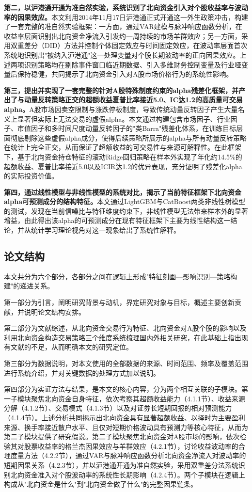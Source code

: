 \documentclass{article}
\begin{document}
\textbf{第二，以沪港通开通为准自然实验，系统识别了北向资金引入对个股收益率与波动率的因果效应。}本文利用2014年11月17日沪港通正式开通这一外生政策冲击，构建了一套完整的准自然实验框架：一方面，通过VAR建模与脉冲响应函数分析，在收益率层面识别出北向资金净流入引发约一周持续的市场羊群效应；另一方面，采用双重差分（DID）方法并控制个体固定效应与时间固定效应，在波动率层面首次系统地识别出"被纳入沪港通"这一处理变量对个股长期波动率的正向因果效应。上述两项识别策略均在剔除事件窗口临近期数据、引入多维财务控制变量及行业哑变量后保持稳健，共同揭示了北向资金引入对A股市场价格行为的系统性影响。

\textbf{第三，提出并实现了一套完整的针对A股特殊制度约束的alpha残差化框架，并产出了与动量反转策略正交的超额收益夏普比率接近5.0、IC达1.2的高质量可交易alpha。}A股市场因卖空限制与涨跌停板制度，导致传统动量反转因子产生大量名义上显著但实际上无法交易的虚假alpha。本文通过构建包含市场因子、行业因子、市值因子和多时间尺度动量反转因子的"类Barra"残差化体系，在训练目标层面彻底剔除这些虚假alpha成分，使得后续策略所展示的alpha与所有动量反转策略在统计上完全正交，从而保证了超额收益的可交易性与来源可解释性。在此框架下，基于北向资金持仓特征的滚动Ridge回归策略在样本外实现了年化约14.5\%的超额收益、夏普比率接近5.0以及ICIR达1.2的优异表现，充分证明了残差化alpha的实际投资价值。

\textbf{第四，通过线性模型与非线性模型的系统对比，揭示了当前特征框架下北向资金alpha可预测成分的结构特征。}本文通过LightGBM与CatBoost两类非线性树模型的测试，发现在当前信噪比与特征维度约束下，非线性模型无法带来样本外的显著增益，由此得出该alpha的可预测成分在现有特征框架下主要为线性结构这一结论，并从统计学习理论视角对这一现象给出了系统性解释。

\subsection{论文结构}

本文共分为六个部分，各部分之间在逻辑上形成"特征刻画—影响识别—策略构建"的递进关系。

第一部分为引言，阐明研究背景与动机，界定研究对象与目标，概述主要创新贡献，并说明论文结构安排。

第二部分为文献综述，从北向资金交易行为特征、北向资金对A股个股的影响以及利用北向资金构造交易策略三个维度系统梳理国内外相关研究，在此基础上指出现有文献的不足，从而明确本文的研究定位。

第三部分为数据说明，对本文使用的全部数据的来源、时间范围、频率及覆盖范围进行系统介绍，并对关键数据的处理方式加以说明。

第四部分为实证方法与结果，是本文的核心内容，分为两个相互关联的子模块。第一子模块聚焦北向资金自身特征，依次考察其超额收益能力（4.1.1节）、收益来源分解（4.1.2节）、交易模式（4.1.3节）以及对证券长短期回报的相对预测能力（4.1.4节）。上述分析共同揭示出北向资金具有显著超额收益、以择时为主要盈利来源、换手率接近散户水平、且仅对短期价格波动具有预测力等核心特征，从而为第二子模块提供了研究假说。第二子模块聚焦北向资金对A股市场的影响，依次检验其对股票收益率的格兰杰因果效应与羊群效应（4.2.1节），讨论收益波动率的合理度量方法（4.2.2节），通过VAR与脉冲响应函数分析北向资金净流入对波动率的短期因果关系（4.2.3节），并以沪港通开通为准自然实验，采用双重差分法系统识别北向资金准入对个股波动率的系统性长期影响（4.2.4节）。两个子模块在逻辑上构成从"北向资金是什么"到"北向资金做了什么"的完整因果链条。
\end{document}
